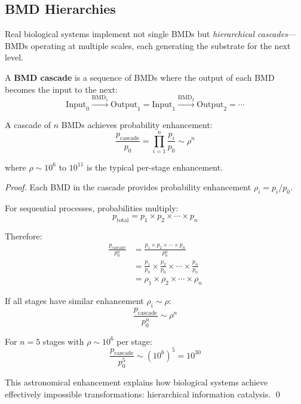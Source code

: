 \subsection{BMD Hierarchies}

Real biological systems implement not single BMDs but \textit{hierarchical cascades}—BMDs operating at multiple scales, each generating the substrate for the next level.

\begin{definition}
\label{def:bmd_cascade}
A \textbf{BMD cascade} is a sequence of BMDs where the output of each BMD becomes the input to the next:
\begin{equation}
\text{Input}_0 \xrightarrow{\text{BMD}_1} \text{Output}_1 = \text{Input}_1 \xrightarrow{\text{BMD}_2} \text{Output}_2 = \cdots
\end{equation}
\end{definition}

\begin{theorem}
\label{thm:exponential_filtering}
A cascade of $n$ BMDs achieves probability enhancement:
\begin{equation}
\frac{p_{\text{cascade}}}{p_0} = \prod_{i=1}^n \frac{p_i}{p_0} \sim \rho^n
\end{equation}

where $\rho \sim 10^6$ to $10^{11}$ is the typical per-stage enhancement.
\end{theorem}

\begin{proof}
Each BMD in the cascade provides probability enhancement $\rho_i = p_i/p_0$.

For sequential processes, probabilities multiply:
\begin{equation}
p_{\text{total}} = p_1 \times p_2 \times \cdots \times p_n
\end{equation}

Therefore:
\begin{align}
\frac{p_{\text{cascade}}}{p_0^n} &= \frac{p_1 \times p_2 \times \cdots \times p_n}{p_0^n} \\
&= \frac{p_1}{p_0} \times \frac{p_2}{p_0} \times \cdots \times \frac{p_n}{p_0} \\
&= \rho_1 \times \rho_2 \times \cdots \times \rho_n
\end{align}

If all stages have similar enhancement $\rho_i \sim \rho$:
\begin{equation}
\frac{p_{\text{cascade}}}{p_0^n} \sim \rho^n
\end{equation}

For $n = 5$ stages with $\rho \sim 10^6$ per stage:
\begin{equation}
\frac{p_{\text{cascade}}}{p_0^5} \sim (10^6)^5 = 10^{30}
\end{equation}

This astronomical enhancement explains how biological systems achieve effectively impossible transformations: hierarchical information catalysis. \qed
\end{proof}

